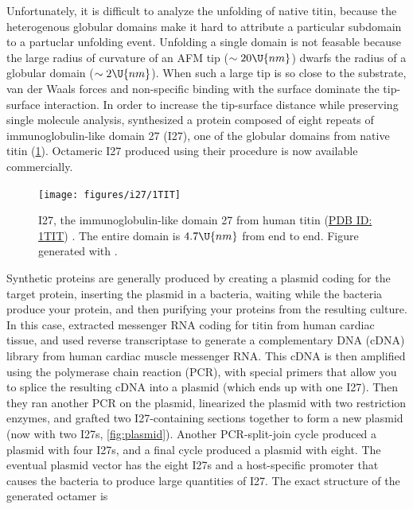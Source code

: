 Unfortunately, it is difficult to analyze the unfolding of native
titin, because the heterogenous globular domains make it hard to
attribute a particular subdomain to a partuclar unfolding event.
Unfolding a single domain is not feasable because the large radius of
curvature of an AFM tip ($\sim20\U{nm}$\citep{olympus-tr400psa})
dwarfs the radius of a globular domain
($\sim2\U{nm}$\citep{improta96}).  When such a large tip is so close
to the substrate, van der Waals forces and non-specific binding with
the surface dominate the tip-surface interaction.  In order to
increase the tip-surface distance while preserving single molecule
analysis, \citet{carrion-vazquez99b} synthesized a protein composed of
eight repeats of immunoglobulin-like domain 27 (I27), one
of the globular domains from native titin (\cref{fig:I27}).  Octameric
I27 produced using their procedure is now available
commercially\citep{athenaes-i27o}.
%

\begin{figure}
  \texttt{[image: figures/i27/1TIT]}
  \caption{I27, the immunoglobulin-like domain 27 from human titin
    (\href{http://dx.doi.org/10.2210/pdb1tit/pdb}{PDB ID: 1TIT})%
    \citep{improta96}.  The entire domain is $4.7\U{nm}$ from end to
    end.  Figure generated with .
    \label{fig:I27}}
\end{figure}

Synthetic proteins are generally produced by creating a plasmid coding
for the target protein, inserting the plasmid in a bacteria, waiting
while the bacteria produce your protein, and then purifying your
proteins from the resulting culture.  In this case,
\citet{carrion-vazquez99b} extracted messenger RNA coding for titin
from human cardiac tissue\citep{rief97a}, and used reverse
transcriptase to generate a complementary DNA (cDNA) library from
human cardiac muscle messenger RNA.  This cDNA is then amplified using
the polymerase chain reaction (PCR), with special primers that allow
you to splice the resulting cDNA into a plasmid (which ends up with
one I27).  Then they ran another PCR on the plasmid, linearized the
plasmid with two restriction enzymes, and grafted two I27-containing
sections together to form a new plasmid (now with two I27s,
\cref{fig:plasmid}).  Another PCR-split-join cycle produced a plasmid
with four I27s, and a final cycle produced a plasmid with eight.  The
eventual plasmid vector has the eight I27s and a host-specific
promoter that causes the bacteria to produce large quantities of I27.
The exact structure of the generated octamer
is\citep{carrion-vazquez99b}

